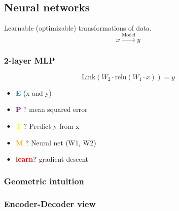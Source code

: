 \documentclass[twoside]{article}
\begin{document}
\subsection{Neural networks}
\begin{definition}
    Learnable (optimizable) transformations of data.
    \begin{equation}
        x \overset{\text{Model}}{\mapsto} y
    \end{equation}
\end{definition}

\subsubsection{2-layer MLP}
\begin{definition}
    \begin{equation}
        \text{Link}(W_2 \cdot \text{relu}(W_1 \cdot x)) = y
    \end{equation}

\begin{itemize}
    \item \textcolor{teal}{\textbf{E}} (x and y)
    \item \textcolor{purple}{\textbf{P}} ? mean squared error
    \item \textcolor{yellow}{\textbf{T}} ? Predict y from x
    \item \textcolor{orange}{\textbf{M}} ? Neural net (W1, W2)
    \item \textcolor{red}{\textbf{learn?}} gradient descent
\end{itemize}
\end{definition}

\subsubsection{Geometric intuition}

\subsubsection{Encoder-Decoder view}
\end{document}

